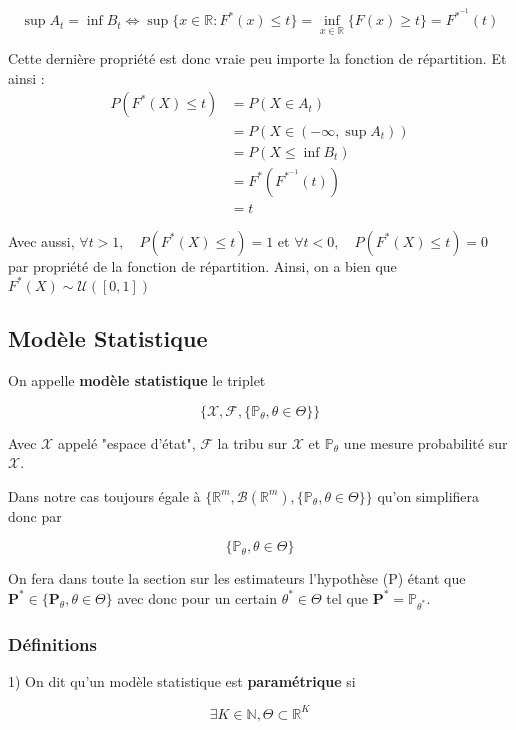 \documentclass[12pt]{article}
\newcommand{\espace}{\vspace{1.5em}}
\newcommand{\petitespace}{\vspace{0.5cm}}
\newcommand{\bb}[1]{\mathbb{#1}} %
\newcommand{\R}{\bb{R}} %
\renewcommand{\bf}[1]{\mathbf{#1}}
\newcommand{\N}{\bb{N}}%
\renewcommand{\P}{\bb{P}}%
\renewcommand{\cal}{\mathcal}
\newcommand{\Inf}[1]{\inf\limits_{#1}}
\renewcommand{\bf}[1]{\mathbf{#1}}
\newcommand{\1}{\bb{1}} %
\begin{document}
{$$\sup A_t  =  \inf B_t  \iff   \sup \{x\in \R : F^*(x) \le t \} = \Inf{x \in \R}\{F(x)\ge t\} = F^{*^{-1}}(t)$$

Cette dernière propriété est donc vraie peu importe la fonction de répartition. Et ainsi :
\begin{align*}
	P(F^*(X) \le t) &= P(X \in A_t)\\
	&= P(X \in (-\infty, \sup A_t) )\\
	&= P(X \le \inf B_t)\\
	& = F^*(F^{*^{-1}}(t))\\
	& = t
\end{align*}

\petitespace

Avec aussi, $\forall t >1, \quad P(F^*(X) \le t) = 1$ et $\forall t <0, \quad P(F^*(X)\le t) =0$ par propriété de la fonction de répartition. Ainsi, on a bien que $F^*(X) \sim \cal U([0,1])$

\petitespace}






\subsection{Modèle Statistique}

On appelle \textbf{modèle statistique} le triplet

$$\{ \cal X, \cal F, \{\P_\theta, \theta \in \Theta \}\} $$

Avec $\cal X$ appelé "espace d'état", $\cal F$ la tribu sur $\cal X$ et $\P_\theta$ une mesure probabilité sur $\cal X$.


Dans notre cas toujours égale à $\{ \R^m, \cal B(\R^m), \{\P_\theta, \theta \in \Theta \}\} $ qu'on simplifiera donc par 

$$ \{\P_\theta, \theta \in \Theta\}$$


On fera dans toute la section sur les estimateurs l'hypothèse (P) étant que $\bf P^* \in \{\bf P_\theta, \theta \in \Theta\}$ avec donc pour un certain $\theta^* \in \Theta$ tel que $\bf P^* = \P_{\theta^*}$. \espace

\subsubsection{Définitions}\espace

1) On dit qu'un modèle statistique est \textbf{paramétrique} si

$$\exists K \in \N, \Theta \subset \R^K$$
\end{document}
